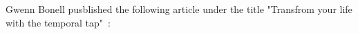 \documentclass[../main.tex]{subfiles}
\begin{document}
Gwenn Bonell pusblished the following article under the title "Transfrom your life with the temporal tap"~\cite{EFT}:


\end{document}
